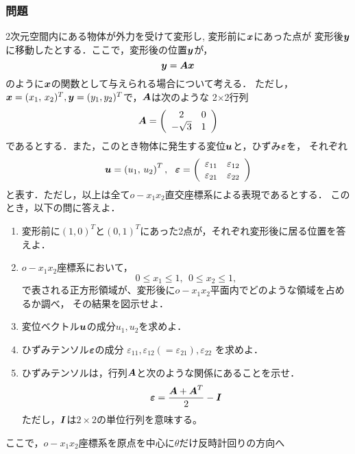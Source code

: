 \documentclass[10pt,a4j]{jarticle}
\begin{document}
\subsubsection*{問題}
2次元空間内にある物体が外力を受けて変形し, 変形前に$\mbox{\boldmath $x$}$にあった点が
変形後$\mbox{\boldmath $y$}$に移動したとする．ここで，変形後の位置$\mbox{\boldmath $y$}$が，
\begin{equation}
	\mbox{\boldmath $y$}=\mbox{\boldmath $A$}\mbox{\boldmath $x$}
	\label{eqn:disp_fld}
\end{equation}
のように$\mbox{\boldmath $x$}$の関数として与えられる場合について考える．
ただし，$\mbox{\boldmath $x$}=(x_1,\, x_2)^T, \mbox{\boldmath $y$}=(y_1, y_2)^T$で，$\mbox{\boldmath $A$}$は次のような
2$\times$2行列
\begin{equation}
	\mbox{\boldmath $A$}=
	\left(
	\begin{array}{cc}
		 2 & 0 \\
	 -\sqrt{3} & 1 
	\end{array}
	\label{eqn:Amat}
	\right)
\end{equation}
であるとする．また，このとき物体に発生する変位$\mbox{\boldmath $u$}$と，ひずみ$\mbox{\boldmath $\varepsilon$}$を，
それぞれ
\begin{equation}
	\fat{u}=\left( u_1,\, u_2 \right)^T
	, \ \ 
	\fat{\varepsilon}
	=
	\left(
	\begin{array}{cc}
		\varepsilon_{11} & \varepsilon_{12} \\
		\varepsilon_{21} & \varepsilon_{22} 
	\end{array}
	\right)
\end{equation}
と表す．ただし，以上は全て$o-x_1x_2$直交座標系による表現であるとする．
このとき，以下の問に答えよ．
\begin{enumerate}
\item
	変形前に$(1,0)^T$と$(0,1)^T$にあった2点が，それぞれ変形後に居る位置を答えよ．
\item
	$o-x_1x_2$座標系において，
	\[
		0\leq x_1 \leq 1, 
		\ \
		0\leq x_2 \leq 1, 
	\]
	で表される正方形領域が、変形後に$o-x_1x_2$平面内でどのような領域を占めるか調べ，
	その結果を図示せよ．
\item
	変位ベクトル$\mbox{\boldmath $u$}$の成分$u_1,u_2$を求めよ．
\item
	ひずみテンソル$\mbox{\boldmath $\varepsilon$}$の成分
	$\varepsilon_{11},\varepsilon_{12}(=\varepsilon_{21}), \varepsilon_{22}$
	を求めよ．
\item
	ひずみテンソルは，行列$\mbox{\boldmath $A$}$と次のような関係にあることを示せ．
	\[
		\mbox{\boldmath $\varepsilon$}=\frac{\mbox{\boldmath $A$}+\mbox{\boldmath $A$}^T}{2}-\mbox{\boldmath $I$}
	\]
	ただし，$\mbox{\boldmath $I$}$は$2\times 2$の単位行列を意味する。
\end{enumerate}
ここで，$o-x_1x_2$座標系を原点を中心に$\theta$だけ反時計回りの方向へ
\end{document}
